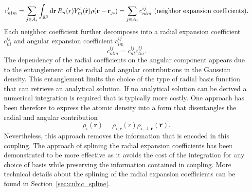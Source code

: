 \begin{equation}
  \label{eq:neighbor_contr}
  c^i_{nlm} = \sum_{j\in A_i}\int_{\mathbb{R}^3}\mathrm{d}\mathbf{r}\, R_n(r)Y_m^l(\hat{\mathbf{r}})\rho(\mathbf{r}-\mathbf{r}_{ji}) = \sum_{j\in A_i}c^{ij}_{nlm} \textrm{ (neighbor expansion coefficients)}.\\
\end{equation}
Each neighbor coefficient further decomposes into a radial expansion coefficient $c_{nl}^{ij}$ and angular expansion coefficient $c_{lm}^{ij}$
\begin{equation}
  \label{eq:radial_expansion}
  c^{ij}_{nlm} = c_{nl}^{ij}c^{ij}_{lm}.
\end{equation}
The dependency of the radial coefficients on the angular component appears due to the entanglement of the radial and angular contributions in the Gaussian density.
This entanglement limits the choice of the type of radial basis function that can retrieve an analytical solution.
If no analytical solution can be derived a numerical integration is required that is typically more costly\cite{musil2021efficient}.
One approach has been therefore to express the atomic density into a form that disentangles the radial and angular contribution\cite{caro2019optimizing} 
\begin{equation}
  \rho_i(\mathbf{r}) = \rho_{i,r}(r)\rho_{i,\perp \mathbf{r}}(\hat{\mathbf{r}}).
\end{equation}
Nevertheless, this approach removes the information that is encoded in this coupling.
The approach of splining the radial expansion coefficients has been demonstrated to be more effective as it avoids the cost of the integration for any choice of basis while preserving the information contained in coupling. 
More technical details about the splining of the radial expansion coefficients can be found in Section~\ref{sec:cubic_spline}.

